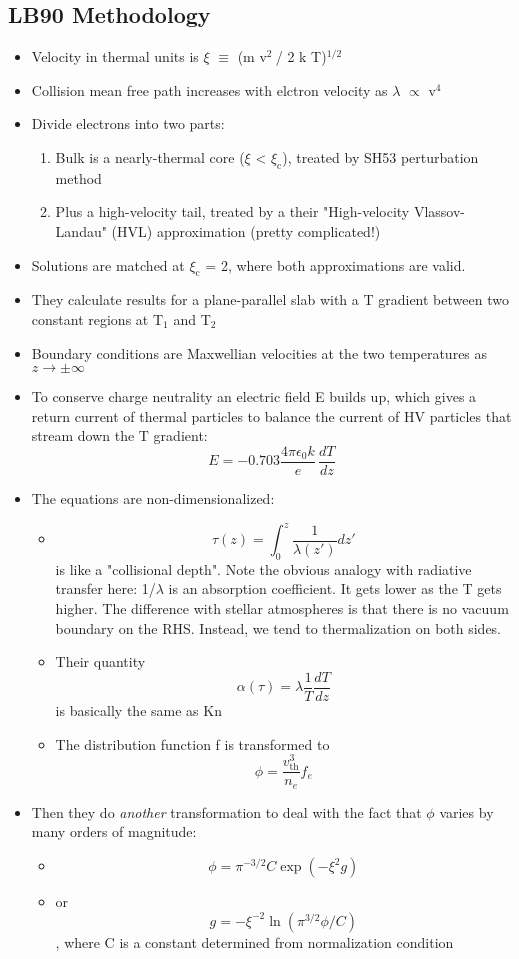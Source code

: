 \documentclass[11pt]{article}
\begin{document}
\subsection{LB90 Methodology}
\label{sec:orgheadline13}
\begin{itemize}
\item Velocity in thermal units is \(\xi\) \(\equiv\) (m v\(^{\text{2 }}\)/ 2 k T)\(^{\text{1/2}}\)
\item Collision mean free path increases with elctron velocity as \(\lambda\) \(\propto\) v\(^{\text{4}}\)
\item Divide electrons into two parts:
\begin{enumerate}
\item Bulk is a nearly-thermal core (\(\xi\) < \(\xi_{\text{c}}\)), treated by SH53 perturbation method
\item Plus a high-velocity tail, treated by a their "High-velocity Vlassov-Landau" (HVL) approximation (pretty complicated!)
\end{enumerate}
\item Solutions are matched at \(\xi_{\text{c}}\) = 2, where both approximations are valid.
\item They calculate results for a plane-parallel slab with a T gradient between two constant regions at T\(_{\text{1}}\) and T\(_{\text{2}}\)
\item Boundary conditions are Maxwellian velocities at the two temperatures as \(z \to \pm\infty\)
\item To conserve charge neutrality an electric field E builds up, which gives a return current of thermal particles to balance the current of HV particles that stream down the T gradient: \[E = -0.703 \frac{4\pi \epsilon_{0}k}{e} \, \frac{d T}{d z}\]
\item The equations are non-dimensionalized:
\begin{itemize}
\item \[\tau(z) = \int_{0}^{z} \frac{1}{\lambda(z')}  d z'\]is like a "collisional depth".  Note the obvious analogy with radiative transfer here: 1/\(\lambda\) is an absorption coefficient.  It gets lower as the T gets higher.   The difference with stellar atmospheres is that there is no vacuum boundary on the RHS.  Instead, we tend to thermalization on both sides.
\item Their quantity \[\alpha(\tau) = \lambda \frac{1}{T} \frac{dT}{dz}\] is basically the same as Kn
\item The distribution function f is transformed to \[\phi = \frac{v_\text{th}^{3}}{n_{e}} f_{e}\]
\end{itemize}
\item Then they do \emph{another} transformation to deal with the fact that \(\phi\) varies by many orders of magnitude:
\begin{itemize}
\item \[ \phi = \pi^{-3/2} C \exp(-\xi^{2} g)\]
\item or \[ g = -\xi^{-2} \ln(\pi^{3/2} \phi / C)\], where C is a constant determined from normalization condition
\end{itemize}
\end{itemize}
\end{document}
